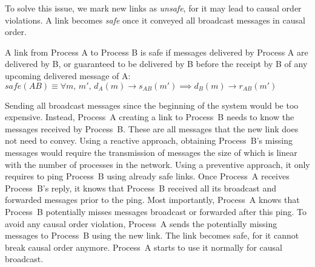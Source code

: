 To solve this issue, we mark new links as \emph{unsafe}, for it may lead to
causal order violations. A link becomes \emph{safe} once it conveyed all
broadcast messages in causal order.

\begin{definition}
  A link from Process A to Process B is safe if messages delivered by Process A
  are delivered by B, or guaranteed to be delivered by B before the receipt by B
  of any upcoming delivered message of A:  \\
  $safe(AB) \equiv \forall m,\, m',\, d_A(m) \rightarrow s_{AB}(m') \implies
  d_B(m) \rightarrow r_{AB}(m')$
\end{definition}

Sending all broadcast messages since the beginning of the system would be too
expensive. Instead, Process~A creating a link to Process~B needs to know the
messages received by Process~B. These are all messages that the new link does
not need to convey.
Using a reactive approach, obtaining Process~B's missing messages would require
the transmission of messages the size of which is linear with the number of
processes in the network. Using a preventive approach, it only requires to ping
Process~B using already safe links. Once Process~A receives Process~B's reply,
it knows that Process~B received all its broadcast and forwarded messages prior
to the ping. Most importantly, Process~A knows that Process~B potentially misses
messages broadcast or forwarded after this ping.  To avoid any causal order
violation, Process~A sends the potentially missing messages to Process~B using
the new link. The link becomes safe, for it cannot break causal order
anymore. Process~A starts to use it normally for causal broadcast.



